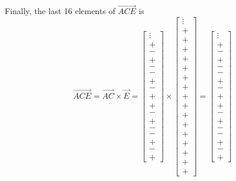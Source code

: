 \documentclass{article}
\begin{document}
Finally, the last 16 elements of $\vec{ACE}$ is
\begin{equation*}
    \vec{ACE} = \vec{AC} \times \vec{E} =
    \begin{bmatrix}\vdots \\ + \\ - \\ + \\ - \\ - \\ + \\ - \\ + \\  + \\ - \\ + \\ - \\ - \\ + \\ - \\ + \end{bmatrix} \times \begin{bmatrix}\vdots \\ + \\ + \\ + \\ + \\ + \\ + \\ + \\ + \\ + \\ + \\ + \\ + \\ + \\ + \\ + \\ +  \end{bmatrix}
    = \begin{bmatrix}\vdots \\ + \\ - \\ + \\ - \\ - \\ + \\ - \\ + \\  + \\ - \\ + \\ - \\ - \\ + \\ - \\ + \end{bmatrix}
\end{equation*}
\end{document}

